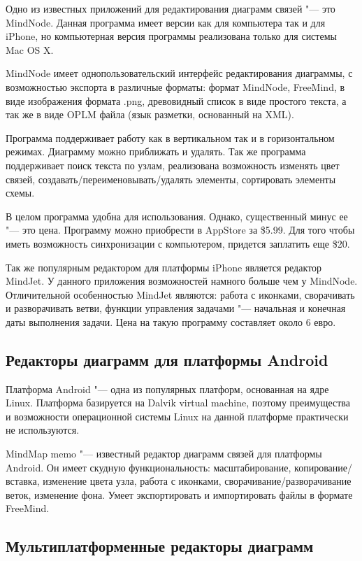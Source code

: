 Одно из известных приложений для редактирования диаграмм связей "--- это
MindNode. Данная программа имеет версии как для компьютера так и для iPhone, но
компьютерная версия программы реализована только для системы Mac OS X.

MindNode имеет однопользовательский интерфейс редактирования диаграммы, с
возможностью экспорта в различные форматы: формат MindNode, FreeMind, в виде
изображения формата .png, древовидный список в виде простого текста, а так же в
виде OPLM файла (язык разметки, основанный на XML).

Программа поддерживает работу как в вертикальном так и в горизонтальном режимах.
Диаграмму можно приближать и удалять. Так же программа поддерживает поиск текста
по узлам, реализована возможность изменять цвет связей,
создавать/переименовывать/удалять элементы, сортировать элементы схемы.

В целом программа удобна для использования. Однако, существенный минус ее "---
это цена. Программу можно приобрести в AppStore за \$5.99. Для того чтобы иметь
возможность синхронизации с компьютером, придется заплатить еще \$20.

Так же популярным редактором для платформы iPhone является редактор MindJet. У
данного приложения возможностей намного больше чем у MindNode. Отличительной
особенностью MindJet являются: работа с иконками, сворачивать и разворачивать
ветви, функции управления задачами "--- начальная и конечная даты выполнения
задачи. Цена на такую программу составляет около 6 евро.

\subsection{Редакторы диаграмм для платформы Android}

Платформа Android "--- одна из популярных платформ, основанная на ядре Linux.
Платформа базируется на Dalvik virtual machine, поэтому преимущества и
возможности операционной системы Linux на данной платформе практически не
используются.

MindMap memo "--- известный редактор диаграмм связей для платформы Android. Он
имеет скудную функциональность: масштабирование, копирование/вставка, изменение
цвета узла, работа с иконками, сворачивание/разворачивание веток, изменение
фона. Умеет экспортировать и импортировать файлы в формате FreeMind.

\subsection{Мультиплатформенные редакторы диаграмм}

